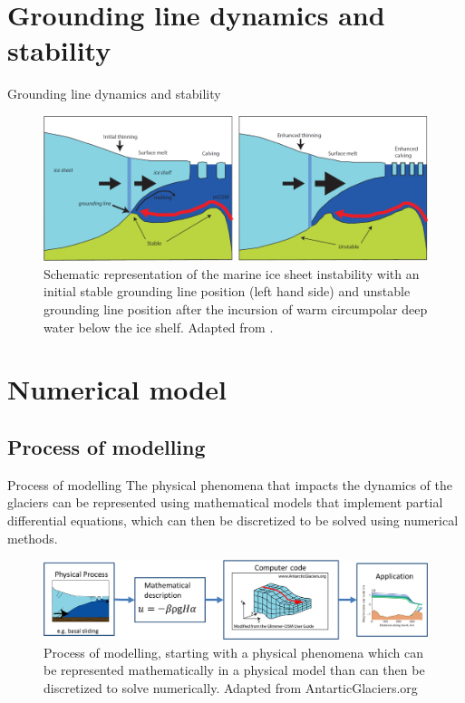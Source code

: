 \documentclass[11pt]{beamer}
\begin{document}
		
	\section{Grounding line dynamics and stability}
		\begin{frame}{Grounding line dynamics and stability}
		\begin{figure}
			\centering
			\includegraphics[scale=0.3]{../fig/GroundingLineInstability.png}
			\caption{Schematic representation of the marine ice sheet instability with an initial stable grounding line position (left hand side) and unstable grounding line position after the incursion of warm circumpolar deep water below the ice shelf. Adapted from \cite{hanna2013white}.}
			\label{grounding_line_instability}
		\end{figure}
		\end{frame}

	\section{Numerical model}
	\subsection{Process of modelling}
	\begin{frame}{Process of modelling}
		\justifying
		The physical phenomena that impacts the dynamics of the glaciers can be represented using mathematical models that implement partial differential equations, which can then be discretized to be solved using numerical methods.
		\begin{figure}
			\centering
			\includegraphics[scale=0.4]{../fig/Numerical_modelling_scheme.png}
			\caption{Process of modelling, starting with a physical phenomena which can be represented mathematically in a physical model than can then be discretized to solve numerically. Adapted from AntarticGlaciers.org}
			\label{Modelling}
		\end{figure}
	\end{frame}
\end{document}
